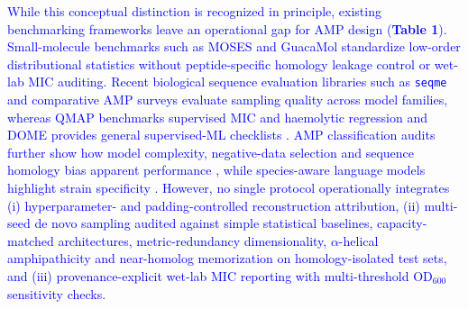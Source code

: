 \documentclass[unnumsec,webpdf,contemporary,large]{oup-authoring-template}
\newcommand{\rev}[1]{\textcolor{blue}{#1}}
\begin{document}
\rev{While this conceptual distinction is recognized in principle, existing benchmarking frameworks leave an operational gap for AMP design (\textbf{Table 1}). Small-molecule benchmarks such as MOSES \cite{ref26} and GuacaMol \cite{ref28} standardize low-order distributional statistics without peptide-specific homology leakage control or wet-lab MIC auditing. Recent biological sequence evaluation libraries such as \texttt{seqme} \cite{ref29} and comparative AMP surveys \cite{ref8} evaluate sampling quality across model families, whereas QMAP \cite{ref13} benchmarks supervised MIC and haemolytic regression and DOME \cite{ref43} provides general supervised-ML checklists \cite{ref44,ref45}. AMP classification audits further show how model complexity, negative-data selection and sequence homology bias apparent performance \cite{refXu2021,ref4,ref5,ref39,ref40}, while species-aware language models highlight strain specificity \cite{refLLAMP}. However, no single protocol operationally integrates (i) hyperparameter- and padding-controlled reconstruction attribution, (ii) multi-seed de novo sampling audited against simple statistical baselines, capacity-matched architectures, metric-redundancy dimensionality, $\alpha$-helical amphipathicity and near-homolog memorization on homology-isolated test sets, and (iii) provenance-explicit wet-lab MIC reporting with multi-threshold OD$_{600}$ sensitivity checks.}
\end{document}
